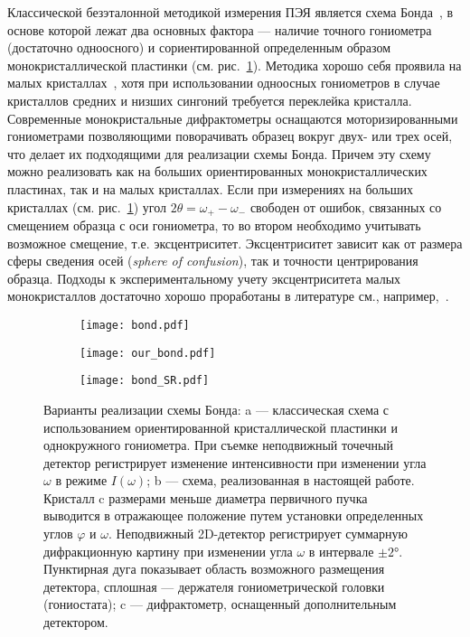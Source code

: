 Классической безэталонной методикой измерения ПЭЯ является схема Бонда~\cite{Bond:1960}, в основе которой лежат два основных фактора — наличие точного гониометра (достаточно одноосного) и сориентированной определенным образом монокристаллической пластинки (см. рис.~\ref{fig:bond}).
Методика хорошо себя проявила на малых кристаллах~\cite{Lisoivan:1988}, хотя при использовании одноосных гониометров в случае кристаллов средних и низших сингоний требуется переклейка кристалла.
Современные монокристальные дифрактометры оснащаются моторизированными гониометрами позволяющими поворачивать образец вокруг двух- или трех осей, что делает их подходящими для реализации схемы Бонда.
Причем эту схему можно реализовать как на больших ориентированных монокристаллических пластинах, так и на малых кристаллах.
Если при измерениях на больших кристаллах (см. рис.~\ref{fig:bond}) угол $2θ = ω_+ - ω_-$ свободен от ошибок, связанных со смещением образца с оси гониометра, то во втором необходимо учитывать возможное смещение, т.е. эксцентриситет.
Эксцентриситет зависит как от размера сферы сведения осей (\textit{sphere of confusion}), так и точности центрирования образца.
Подходы к экспериментальному учету эксцентриситета малых монокристаллов достаточно хорошо проработаны в литературе см., например,~\cite{Ponomarev:1969,King:1979}.

\begin{figure}[ht!]
    \centering
    \begin{subfigure}{0.5\textwidth}
        \centering
        \texttt{[image: bond.pdf]}
        \caption{}%
        \label{fig:bond}
    \end{subfigure}%
    \begin{subfigure}{0.5\textwidth}
        \centering
        \texttt{[image: our\_bond.pdf]}
        \caption{}%
        \label{fig:our_bond}
    \end{subfigure}
    \begin{subfigure}{\textwidth}
        \centering
        \texttt{[image: bond\_SR.pdf]}
        \caption{}%
        \label{fig:bond_SR}
    \end{subfigure}
    \caption{
        Варианты реализации схемы Бонда: a — классическая схема с использованием ориентированной кристаллической пластинки и однокружного гониометра.
        При съемке неподвижный точечный детектор регистрирует изменение интенсивности при изменении угла $ω$ в режиме $I(ω)$;
        b — схема, реализованная в настоящей работе.
        Кристалл c размерами меньше диаметра первичного пучка выводится в отражающее положение путем установки определенных углов $φ$ и $ω$.
        Неподвижный 2D-детектор регистрирует суммарную дифракционную картину при изменении угла $ω$ в интервале $±2°$.
        Пунктирная дуга показывает область возможного размещения детектора, сплошная — держателя гониометрической головки (гониостата);
        c — дифрактометр, оснащенный дополнительным детектором.
    }%
\end{figure}

